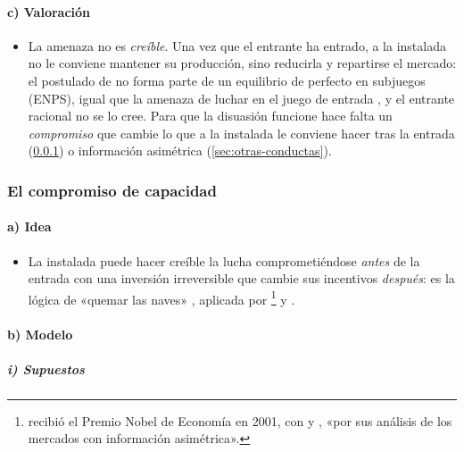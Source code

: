 \documentclass[11pt]{article}
\begin{document}
\paragraph{c) Valoración}

\begin{itemize}
\item La amenaza no es \emph{creíble}. Una vez que el entrante ha entrado, a la instalada no le conviene mantener su producción, sino reducirla y repartirse el mercado: el postulado de  no forma parte de un equilibrio de  perfecto en subjuegos (ENPS), igual que la amenaza de luchar en el juego de entrada , y el entrante racional no se lo cree. Para que la disuasión funcione hace falta un \emph{compromiso} que cambie lo que a la instalada le conviene hacer tras la entrada (\ref{sec:compromiso-capacidad}) o información asimétrica (\ref{sec:otras-conductas}).
\end{itemize}

\subsubsection{El compromiso de capacidad}\label{sec:compromiso-capacidad}

\paragraph{a) Idea}

\begin{itemize}
\item La instalada puede hacer creíble la lucha comprometiéndose \emph{antes} de la entrada con una inversión irreversible que cambie sus incentivos \emph{después}: es la lógica de «quemar las naves»\nocite{Schelling1960Strategy} , aplicada por \textcite{Spence1977Entry}\footnote{ recibió el Premio Nobel de Economía en 2001, con  y , «por sus análisis de los mercados con información asimétrica»\nocite{Nobel2001AkerlofSpenceStiglitz}.} y \textcite{Dixit1980Role}.
\end{itemize}

\paragraph{b) Modelo}

\subparagraph{i) Supuestos}
\end{document}
